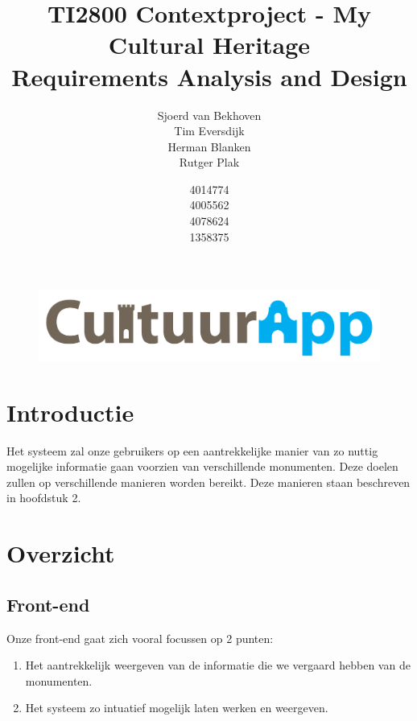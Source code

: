 \documentclass[a4paper,10pt]{article}
\begin{document}
\title{TI2800 Contextproject - My Cultural Heritage\\ Requirements Analysis and Design}
\author{Sjoerd van Bekhoven\\ Tim Eversdijk \\ Herman Blanken \\ Rutger Plak \and 4014774 \\ 4005562 \\ 4078624 \\ 1358375}

\maketitle
\setcounter{page}{0}
\thispagestyle{empty}
\vspace{10cm}
		\begin{figure}[ht!]
				\centering
				\includegraphics[width=\textwidth]{cultuurapp-logo.png}
			\end{figure}
\clearpage

\tableofcontents

\clearpage
\section{Introductie}
Het systeem zal onze gebruikers op een aantrekkelijke manier van zo nuttig mogelijke informatie gaan voorzien van verschillende monumenten. Deze doelen zullen op verschillende manieren worden bereikt. Deze manieren staan beschreven in hoofdstuk 2.

\clearpage
	\section{Overzicht}
		\subsection{Front-end}
			Onze front-end gaat zich vooral focussen op 2 punten:
			\begin{enumerate}
				\item Het aantrekkelijk weergeven van de informatie die we vergaard hebben van de monumenten.
				\item Het systeem zo intuatief mogelijk laten werken en weergeven.
			\end{enumerate}
				
\end{document}

